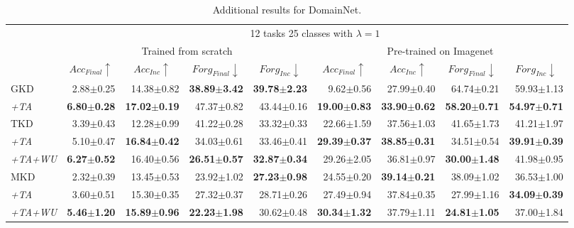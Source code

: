 \begin{appendix}
\begin{table*}[t]
{\begin{tabular}{@{}lrrrrrrrr@{}}
 & \multicolumn{8}{c}{12 tasks 25 classes with $\lambda=1$}
 \\ \cmidrule{2-9}
 &
  \multicolumn{4}{c}{Trained from scratch} &
  \multicolumn{4}{c}{Pre-trained on Imagenet}
  \\ \cmidrule{2-9}
 &
  \multicolumn{1}{c}{$Acc_{Final} \uparrow$} &
  \multicolumn{1}{c}{$Acc_{Inc} \uparrow$} &
  \multicolumn{1}{c}{$Forg_{Final} \downarrow$} &
  \multicolumn{1}{c}{$Forg_{Inc} \downarrow$} &
  \multicolumn{1}{c}{$Acc_{Final} \uparrow$} &
  \multicolumn{1}{c}{$Acc_{Inc} \uparrow$} &
  \multicolumn{1}{c}{$Forg_{Final} \downarrow$} &
  \multicolumn{1}{c}{$Forg_{Inc} \downarrow$} \\ \cmidrule{2-9}
GKD &
  2.88$\pm$0.25 &
  14.38$\pm$0.82 &
  \textbf{38.89$\pm$3.42} &
  \textbf{39.78$\pm$2.23} &
  9.62$\pm$0.56 &
  27.99$\pm$0.40 &
  64.74$\pm$0.21 &
  59.93$\pm$1.13
   \\
\textit{+TA} &
  \textbf{6.80$\pm$0.28} &
  \textbf{17.02$\pm$0.19} &
  47.37$\pm$0.82 &
  43.44$\pm$0.16 &
  \textbf{19.00$\pm$0.83} &
  \textbf{33.90$\pm$0.62} &
  \textbf{58.20$\pm$0.71} &
  \textbf{54.97$\pm$0.71} \\ \midrule
TKD &
  3.39$\pm$0.43 &
  12.28$\pm$0.99 &
  41.22$\pm$0.28 &
  33.32$\pm$0.33 &
  22.66$\pm$1.59 &
  37.56$\pm$1.03 &
  41.65$\pm$1.73 &
  41.21$\pm$1.97 \\
\textit{+TA} &
  5.10$\pm$0.47 &
  \textbf{16.84$\pm$0.42} &
  34.03$\pm$0.61 &
  33.46$\pm$0.41 &
  \textbf{29.39$\pm$0.37} &
  \textbf{38.85$\pm$0.31} &
  34.51$\pm$0.54 &
  \textbf{39.91$\pm$0.39} \\
\textit{+TA+WU} &
  \textbf{6.27$\pm$0.52} &
  16.40$\pm$0.56 &
  \textbf{26.51$\pm$0.57} &
  \textbf{32.87$\pm$0.34} &
  29.26$\pm$2.05 &
  36.81$\pm$0.97 &
  \textbf{30.00$\pm$1.48} &
  41.98$\pm$0.95 \\ 
  
  \midrule
MKD & 2.32$\pm$0.39 & 13.45$\pm$0.53 & 23.92$\pm$1.02 & \textbf{27.23$\pm$0.98} & 24.55$\pm$0.20  & \textbf{39.14$\pm$0.21} & 38.09$\pm$1.02 & 36.53$\pm$1.00  \\
\textit{+TA} & 3.60$\pm$0.51  & 15.30$\pm$0.35  & 27.32$\pm$0.37 & 28.71$\pm$0.26 & 27.49$\pm$0.94 & 37.84$\pm$0.35 & 27.99$\pm$1.16 & \textbf{34.09$\pm$0.39} \\
\textit{+TA+WU} & \textbf{5.46$\pm$1.20} & \textbf{15.89$\pm$0.96} & \textbf{22.23$\pm$1.98} & 30.62$\pm$0.48 & \textbf{30.34$\pm$1.32}   & 37.79$\pm$1.11  & \textbf{24.81$\pm$1.05}  & 37.00$\pm$1.84 
  \\
  \bottomrule
\end{tabular}%
}
\caption{Additional results for DomainNet.}
\label{tab:app:domainnet}
\end{table*}



\end{appendix}
